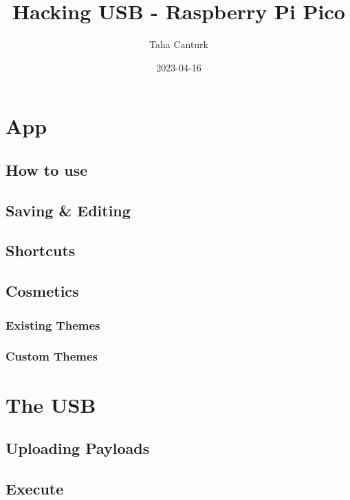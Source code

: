 \documentclass[a4paper,12pt]{article}
\title{Hacking USB - Raspberry Pi Pico}
\author{Taha Canturk}
\date{2023-04-16}
\begin{document}
\maketitle
\newpage

\tableofcontents

\large

\section{App}

\subsection{How to use}

\subsection{Saving \& Editing}

\subsection{Shortcuts}

\subsection{Cosmetics}

\subsubsection{Existing Themes}

\subsubsection{Custom Themes}

\section{The USB}

\subsection{Uploading Payloads}

\subsection{Execute}

\subsection{}
\end{document}
